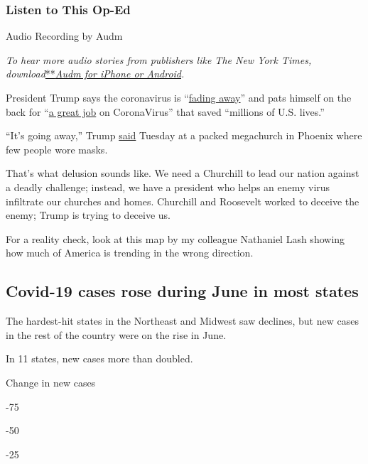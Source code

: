 \hypertarget{listen-to-this-op-ed}{%
\subsubsection{Listen to This Op-Ed}\label{listen-to-this-op-ed}}

Audio Recording by Audm

\emph{To hear more audio stories from publishers like The New York
Times,
download}\href{https://www.audm.com/?utm_source=nytmag\&utm_medium=embed\&utm_campaign=left_behind_draper}{**}\href{https://www.audm.com/?utm_source=nytopinion\&utm_medium=embed\&utm_campaign=trump_coronavirus_nightmare}{\emph{Audm
for iPhone or Android}}\emph{.}

President Trump says the coronavirus is
``\href{https://time.com/5855541/trump-coronavirus-fade-away/}{fading
away}'' and pats himself on the back for
``\href{https://twitter.com/realDonaldTrump/status/1275438921552257026}{a
great job} on CoronaVirus'' that saved ``millions of U.S. lives.''

``It's going away,'' Trump
\href{https://www.politico.com/news/2020/06/23/trump-rally-arizona-336565}{said}
Tuesday at a packed megachurch in Phoenix where few people wore masks.

That's what delusion sounds like. We need a Churchill to lead our nation
against a deadly challenge; instead, we have a president who helps an
enemy virus infiltrate our churches and homes. Churchill and Roosevelt
worked to deceive the enemy; Trump is trying to deceive us.

For a reality check, look at this map by my colleague Nathaniel Lash
showing how much of America is trending in the wrong direction.

\hypertarget{covid-19-cases-rose-during-june-in-most-states}{%
\subsection{Covid-19 cases rose during June in most
states}\label{covid-19-cases-rose-during-june-in-most-states}}

The hardest-hit states in the Northeast and Midwest saw declines, but
new cases in the rest of the country were on the rise in June.

In 11 states, new cases more than doubled.

Change in new cases

-75

-50

-25

